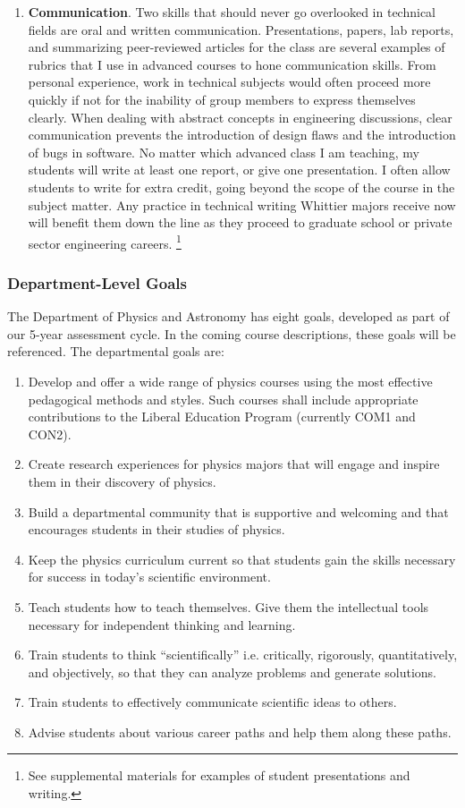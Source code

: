 \documentclass[../../main.tex]{subfiles}
\begin{document}
\begin{enumerate}
\item \textbf{Communication}.  Two skills that should never go overlooked in technical fields are oral and written communication.  Presentations, papers, lab reports, and summarizing peer-reviewed articles for the class are several examples of rubrics that I use in advanced courses to hone communication skills.  From personal experience, work in technical subjects would often proceed more quickly if not for the inability of group members to express themselves clearly.  When dealing with abstract concepts in engineering discussions, clear communication prevents the introduction of design flaws and the introduction of bugs in software. No matter which advanced class I am teaching, my students will write at least one report, or give one presentation.  I often allow students to write for extra credit, going beyond the scope of the course in the subject matter.  Any practice in technical writing Whittier majors receive now will benefit them down the line as they proceed to graduate school or private sector engineering careers. \footnote{See supplemental materials for examples of student presentations and writing.}
\end{enumerate}

\subsubsection{Department-Level Goals}

The Department of Physics and Astronomy has eight goals, developed as part of our 5-year assessment cycle. In the coming course descriptions, these goals will be referenced. The departmental goals are:

\begin{enumerate}
\item Develop and offer a wide range of physics courses using the most effective pedagogical methods and styles.  Such courses shall include appropriate contributions to the Liberal Education Program (currently COM1 and CON2).
\item Create research experiences for physics majors that will engage and inspire them in their discovery of physics.
\item Build a departmental community that is supportive and welcoming and that encourages students in their studies of physics.
\item Keep the physics curriculum current so that students gain the skills necessary for success in today’s scientific environment.
\item Teach students how to teach themselves. Give them the intellectual tools necessary for independent thinking and learning.
\item Train students to think ``scientifically'' i.e. critically, rigorously, quantitatively, and objectively, so that they can analyze problems and generate solutions.
\item Train students to effectively communicate scientific ideas to others.
\item Advise students about various career paths and help them along these paths.
\end{enumerate}
\end{document}

